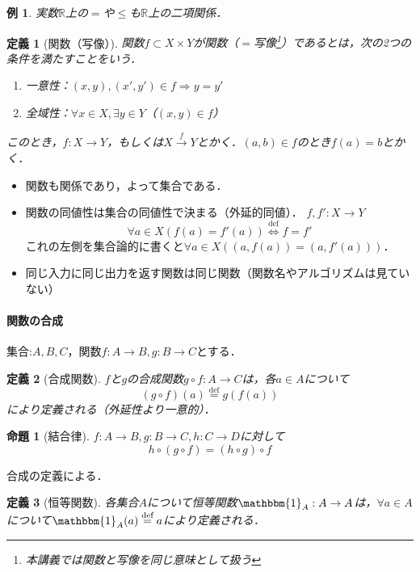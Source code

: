 \documentclass[dvipdfmx,a4j,10pt]{jsarticle}
\makeatletter
\theoremstyle{mystyle1}
\theoremstyle{mystyle2}
\newtheorem{dfn*}{定義}
\newtheorem{prop*}{命題}
\newtheorem{example}{例}
\renewenvironment{proof}[1][\proofname]{\par
  \pushQED{\qed}%
  \normalfont
  \topsep6\p@\@plus6\p@ \trivlist
  \item[\hskip\labelsep{\bfseries\sffamily #1}]\ignorespaces
}{%
  \popQED\endtrivlist\@endpefalse
}
\renewcommand\proofname{証明}
\newcommand{\defLeftrightarrow}{\overset{\text{def}}{\iff}}
\newcommand*{\defeq}{\stackrel{\text{def}}{=}}
\makeatother
\begin{document}
\begin{example}
	実数$\mathbb{R}$上の$=$や$\leq$も$\mathbb{R}$上の二項関係．
\end{example}

\begin{dfn*}[関数（写像）]
	関数$f\subset X\times Y$が関数（$=$写像\footnote{本講義では関数と写像を同じ意味として扱う}）であるとは，次の2つの条件を満たすことをいう．
	\begin{enumerate}
		\item 一意性：$(x,y),(x',y')\in f\Rightarrow y=y'$
		\item 全域性：$\forall x\in X,\exists y \in Y$（$(x,y)\in f$）
	\end{enumerate}
	このとき，$f:X\to Y$，もしくは$X\xrightarrow{f} Y$とかく．$(a,b)\in f$のとき$f(a)=b$とかく．
\end{dfn*}

\begin{itemize}
	\item 関数も関係であり，よって集合である．
	\item 関数の同値性は集合の同値性で決まる（外延的同値）．
	      $f,f':X\to Y$
	      \[
		      \forall a\in X(f(a)=f'(a))\defLeftrightarrow f=f'
	      \]
	      これの左側を集合論的に書くと$\forall a\in X ((a,f(a))=(a,f'(a)))$．
	\item 同じ入力に同じ出力を返す関数は同じ関数（関数名やアルゴリズムは見ていない）
\end{itemize}

\paragraph{関数の合成}

集合:$A,B,C$，関数$f:A\to B,g:B\to C$とする．

\begin{dfn*}[合成関数]
	$f$と$g$の合成関数$g\circ f:A\to C$は，各$a\in A$について
	\[
		(g\circ f)(a)\defeq g(f(a))
	\]
	により定義される（外延性より一意的）．
\end{dfn*}

\begin{prop*}[結合律]
	$f:A\to B, g:B\to C, h:C\to D$に対して
	\[
		h\circ (g\circ f)=(h\circ g)\circ f
	\]
\end{prop*}
\begin{proof}
	合成の定義による．
\end{proof}

\begin{dfn*}[恒等関数]
	各集合$A$について恒等関数$\mathbbm{1}_A:A\to A$は，$\forall a\in A$について$\mathbbm{1}_A(a)\defeq a$により定義される．
\end{dfn*}
\end{document}
